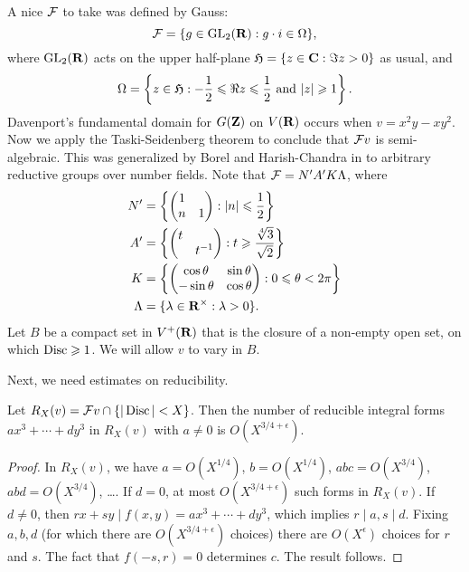 A nice $\mathcal{F}$ to take was defined by Gauss: 
\[
  \mathcal{F} = \{g\in \operatorname{GL}_2(\mathbf{R}):g\cdot i \in \Omega\},
\]
where $\operatorname{GL}_2(\mathbf{R})$ acts on the upper half-plane 
$\mathfrak{H}=\{z\in \mathbf{C}:\Im z>0\}$ as usual, and 
\[
  \Omega=\left\{z\in \mathfrak{H}:-\frac 1 2 \leqslant \Re z\leqslant \frac 1 2\text{ and }|z|\geqslant 1\right\} .
\]
Davenport's fundamental domain for $G(\mathbf{Z})$ on $V(\mathbf{R})$ occurs when 
$v=x^2 y - x y^2$. Now we apply the Taski-Seidenberg theorem to conclude that 
$\mathcal{F} v$ is semi-algebraic. This was generalized by Borel and Harish-Chandra in 
\cite{bh62} to arbitrary reductive groups over number fields. Note that 
$\mathcal{F} = N' A' K \Lambda$, where 
\begin{align*}
  N' &= \left\{\begin{pmatrix} 1 \\ n & 1 \end{pmatrix} : |n|\leqslant \frac 1 2\right\} \\
  A' &= \left\{\begin{pmatrix} t \\ & t^{-1}\end{pmatrix} : t\geqslant \frac{\sqrt[4] 3}{\sqrt 2}\right\} \\
  K &= \left\{\begin{pmatrix}\cos \theta & \sin \theta \\ -\sin \theta & \cos \theta\end{pmatrix} : 0\leqslant \theta < 2\pi\right\} \\
  \Lambda &= \{\lambda\in \mathbf{R}^\times:\lambda>0\} .
\end{align*}
Let $B$ be a compact set in $V^+(\mathbf{R})$ that is the closure of a non-empty open 
set, on which $\operatorname{Disc}\geqslant 1$. We will allow $v$ to vary in $B$. 

Next, we need estimates on reducibility. 

\begin{lemm}
Let $R_X(v)=\mathcal{F} v\cap \{|\operatorname{Disc} |<X\}$. Then the number of reducible 
integral forms $a x^3 + \cdots + d y^3$ in $R_X(v)$ with $a\ne 0$ is 
$O(X^{3/4+\epsilon})$. 
\end{lemm}
\begin{proof}
In $R_X(v)$, we have $a=O(X^{1/4})$, $b=O(X^{1/4})$, $a b c=O(X^{3/4})$, 
$a b d=O(X^{3/4})$, \ldots. If $d=0$, at most $O(X^{3/4+\epsilon})$ such 
forms in $R_X(v)$. If $d\ne 0$, then $r x+s y\mid f(x,y)=a x^3+\cdots + d y^3$, 
which implies $r\mid a,s\mid d$. Fixing $a,b,d$ (for which there are 
$O(X^{3/4+\epsilon})$ choices) there are $O(X^\epsilon)$ choices for $r$ and 
$s$. The fact that $f(-s,r)=0$ determines $c$. The result follows. 
\end{proof}

